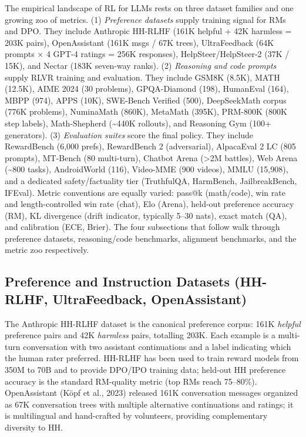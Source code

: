 \documentclass{article}
\begin{document}
The empirical landscape of RL for LLMs rests on three dataset families and one growing zoo of metrics. (1) \emph{Preference datasets} supply training signal for RMs and DPO. They include Anthropic HH-RLHF (161K helpful + 42K harmless = 203K pairs), OpenAssistant (161K msgs / 67K trees), UltraFeedback (64K prompts × 4 GPT-4 ratings = 256K responses), HelpSteer/HelpSteer-2 (37K / 15K), and Nectar (183K seven-way ranks). (2) \emph{Reasoning and code prompts} supply RLVR training and evaluation. They include GSM8K (8.5K), MATH (12.5K), AIME 2024 (30 problems), GPQA-Diamond (198), HumanEval (164), MBPP (974), APPS (10K), SWE-Bench Verified (500), DeepSeekMath corpus (776K problems), NuminaMath (860K), MetaMath (395K), PRM-800K (800K step labels), Math-Shepherd (\textasciitilde440K rollouts), and Reasoning Gym (100+ generators). (3) \emph{Evaluation suites} score the final policy. They include RewardBench (6,000 prefs), RewardBench 2 (adversarial), AlpacaEval 2 LC (805 prompts), MT-Bench (80 multi-turn), Chatbot Arena (\textgreater2M battles), Web Arena (\textasciitilde800 tasks), AndroidWorld (116), Video-MME (900 videos), MMLU (15,908), and a dedicated safety/factuality tier (TruthfulQA, HarmBench, JailbreakBench, IFEval). Metric conventions are equally varied: pass@k (math/code), win rate and length-controlled win rate (chat), Elo (Arena), held-out preference accuracy (RM), KL divergence (drift indicator, typically 5--30 nats), exact match (QA), and calibration (ECE, Brier). The four subsections that follow walk through preference datasets, reasoning/code benchmarks, alignment benchmarks, and the metric zoo respectively.

\subsection{Preference and Instruction Datasets (HH-RLHF, UltraFeedback, OpenAssistant)}\label{preference-and-instruction-datasets-hh-rlhf-ultrafeedback-openassistant}

The Anthropic HH-RLHF dataset \citep{bai20222022} is the canonical preference corpus: 161K \emph{helpful} preference pairs and 42K \emph{harmless} pairs, totalling 203K. Each example is a multi-turn conversation with two assistant continuations and a label indicating which the human rater preferred. HH-RLHF has been used to train reward models from 350M to 70B and to provide DPO/IPO training data; held-out HH preference accuracy is the standard RM-quality metric (top RMs reach 75--80\%). OpenAssistant (Köpf et al., 2023) released 161K conversation messages organized as 67K conversation trees with multiple alternative continuations and ratings; it is multilingual and hand-crafted by volunteers, providing complementary diversity to HH.
\end{document}
